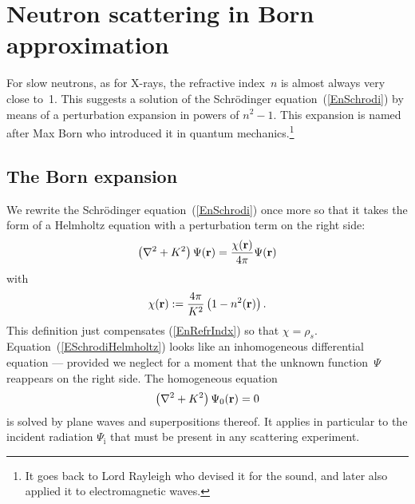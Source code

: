 
\section{Neutron scattering in Born approximation}

For slow neutrons, as for X-rays, the refractive index~$n$ is almost always
very close to~1.
This suggests a solution of the Schrödinger equation~(\ref{EnSchrodi})
by means of a perturbation expansion in powers of $n^2-1$.
This expansion is named after Max Born
who introduced it in quantum mechanics.\footnote
{It goes back to Lord Rayleigh
who devised it for the sound,
and later also applied it to electromagnetic waves.}

\subsection{The Born expansion}\label{SBorn}


We rewrite the Schrödinger equation~(\ref{EnSchrodi})
once more so that it takes the form of a Helmholtz equation
with a perturbation term on the right side:
\begin{equation}\label{ESchrodiHelmholtz}
  \left(\mathbf{\nabla}^2+K^2\right)\Psi(\mathbf{r})
  = \frac{\chi(\mathbf{r})}{4\pi}\Psi(\mathbf{r})
\end{equation}
with
\begin{equation}\label{EChiDef}
  \chi(\mathbf{r}) := \frac{4\pi}{K^2}\left(1-n^2(\mathbf{r})\right).
\end{equation}
This definition just compensates (\ref{EnRefrIndx}) so that $\chi=\rho_s$.
Equation~(\ref{ESchrodiHelmholtz}) looks
like an inhomogeneous differential equation ---
provided we neglect for a moment that the unknown function~$\Psi$
reappears on the right side.
The homogeneous equation
\begin{equation}\label{EHelmholtzHomog}
  \left(\mathbf{\nabla}^2+K^2\right)\Psi_0(\mathbf{r}) = 0
\end{equation}
is solved by plane waves and superpositions thereof.
It applies in particular to the incident radiation
$\Psi_\text{i}$ that must be present in any scattering experiment.

